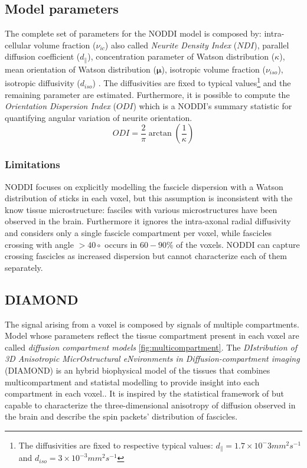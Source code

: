   \subsection*{Model parameters}
  The complete set of parameters for the NODDI model is composed by: intra-cellular volume fraction ($\nu_{ic}$) also called \emph{Neurite Density Index} ($NDI$), parallel diffusion coefficient ($d_{\parallel}$), concentration parameter of Watson distribution ($\kappa$), mean orientation of Watson distribution ($\mathbf{\mu}$), isotropic volume fraction ($\nu_{iso}$), isotropic diffusivity ($d_{iso}$) \cite{zhang2012noddi}.
  The diffusivities are fixed to typical values\footnote{The diffusivities are fixed to respective typical values: $d_{\parallel}=1.7\times10^-3 mm^2s^{-1}$ and $d_{iso}=3\times10^{-3}mm^2s^{-1}$} and the remaining parameter are estimated. Furthermore, it is possible to compute the \emph{Orientation Dispersion Index} ($ODI$) \cite{zhang2011axon} which is a NODDI's summary statistic for quantifying angular variation of neurite orientation.
  \begin{equation}
   ODI = \frac{2}{\pi}\arctan(\frac{1}{\kappa})
  \end{equation}

  \subsubsection*{Limitations}
  NODDI focuses on explicitly modelling the fascicle dispersion with a Watson distribution of sticks in each voxel, but this assumption is inconsistent with the know tissue microstructure: fasciles with various microstructures have been observed in the brain. Furthermore it ignores the intra-axonal radial diffusivity and considers only a single fascicle compartment per voxel, while fascicles crossing with angle $>40\circ$ occurs in $60-90\%$ of the voxels. NODDI can capture crossing fascicles as increased dispersion but cannot characterize each of them separately. \cite{scherrer2016diamond}
 \subsection{DIAMOND}
 The signal arising from a voxel is composed by signals of multiple compartments. Model whose parameters reflect the tissue compartment present in each voxel are called \emph{diffusion compartment models} \ref{fig:multicompartment}. The \emph{DIstribution of 3D Anisotropic MicrOstructural eNvironments in Diffusion-compartment imaging} (DIAMOND) is an hybrid biophysical model of the tissues that combines multicompartment and statistal modelling to provide insight into each compartment in each voxel.\cite{scherrer2016diamond}. It is inspired by the statistical framework of \cite{yablonskiy2003} but capable to characterize the three-dimensional anisotropy of diffusion observed in the brain and describe the spin packets' distribution of fascicles. 

